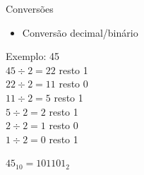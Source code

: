 

\begin{frame}{Conversões}
    \begin{itemize}
        \item Conversão decimal/binário
    \end{itemize}
    Exemplo: 45 \\[0.2cm]
    \centering
    $45 \div 2 = 22$ resto 1 \\[0.2cm]
    $22 \div 2 = 11$ resto 0 \\[0.2cm]
    $11 \div 2 = 5$ resto 1 \\[0.2cm]
    $5 \div 2 = 2$ resto 1 \\[0.2cm]
    $2 \div 2 = 1$ resto 0 \\[0.2cm]
    $1 \div 2 = 0$ resto 1 \\[0.4cm]
    \vspace{0.2cm}

    $45_{10} = 101101_{2}$
\end{frame}
